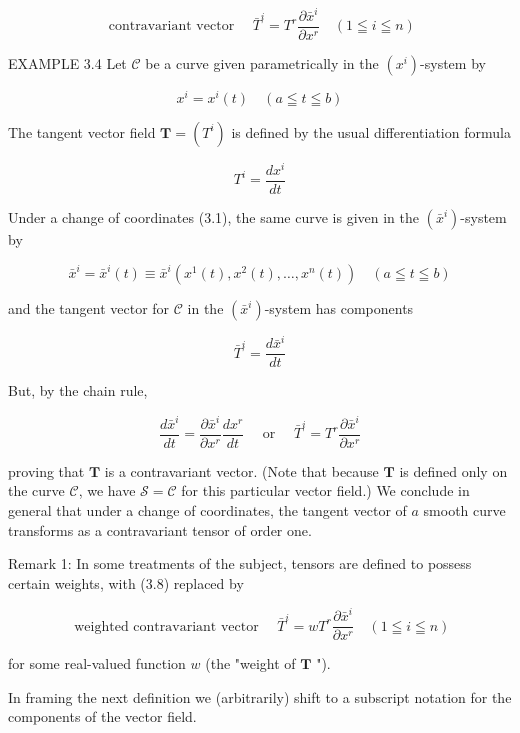 \documentclass[10pt]{article}
\begin{document}
\begin{equation*}
\text { contravariant vector } \quad \bar{T}^{i}=T^{r} \frac{\partial \bar{x}^{i}}{\partial x^{r}} \quad(1 \leqq i \leqq n) \tag{3.8}
\end{equation*}


EXAMPLE 3.4 Let $\mathscr{C}$ be a curve given parametrically in the $\left(x^{i}\right)$-system by

$$
x^{i}=x^{i}(t) \quad(a \leqq t \leqq b)
$$

The tangent vector field $\mathbf{T}=\left(T^{i}\right)$ is defined by the usual differentiation formula

$$
T^{i}=\frac{d x^{i}}{d t}
$$

Under a change of coordinates (3.1), the same curve is given in the $\left(\bar{x}^{i}\right)$-system by

$$
\bar{x}^{i}=\bar{x}^{i}(t) \equiv \bar{x}^{i}\left(x^{1}(t), x^{2}(t), \ldots, x^{n}(t)\right) \quad(a \leqq t \leqq b)
$$

and the tangent vector for $\mathscr{C}$ in the $\left(\bar{x}^{i}\right)$-system has components

$$
\bar{T}^{i}=\frac{d \bar{x}^{i}}{d t}
$$

But, by the chain rule,

$$
\frac{d \bar{x}^{i}}{d t}=\frac{\partial \bar{x}^{i}}{\partial x^{r}} \frac{d x^{r}}{d t} \quad \text { or } \quad \bar{T}^{i}=T^{r} \frac{\partial \bar{x}^{i}}{\partial x^{r}}
$$

proving that $\mathbf{T}$ is a contravariant vector. (Note that because $\mathbf{T}$ is defined only on the curve $\mathscr{C}$, we have $\mathscr{S}=\mathscr{C}$ for this particular vector field.) We conclude in general that under a change of coordinates, the tangent vector of $a$ smooth curve transforms as a contravariant tensor of order one.

Remark 1: In some treatments of the subject, tensors are defined to possess certain weights, with (3.8) replaced by


\begin{equation*}
\text { weighted contravariant vector } \quad \bar{T}^{i}=w T^{r} \frac{\partial \bar{x}^{i}}{\partial x^{r}} \quad(1 \leqq i \leqq n) \tag{3.9}
\end{equation*}


for some real-valued function $w$ (the "weight of $\mathbf{T}$ ").

In framing the next definition we (arbitrarily) shift to a subscript notation for the components of the vector field.
\end{document}
